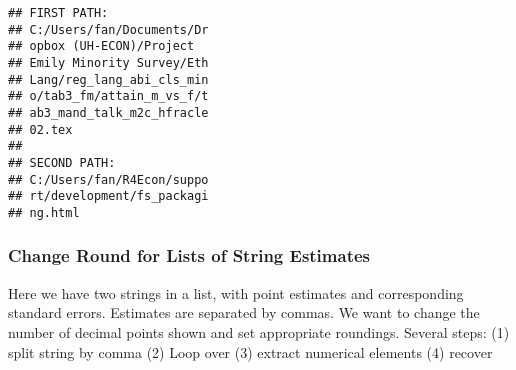 \documentclass[
]{book}
\begin{document}
\begin{verbatim}
## FIRST PATH:
## C:/Users/fan/Documents/Dr
## opbox (UH-ECON)/Project
## Emily Minority Survey/Eth
## Lang/reg_lang_abi_cls_min
## o/tab3_fm/attain_m_vs_f/t
## ab3_mand_talk_m2c_hfracle
## 02.tex
## 
## SECOND PATH:
## C:/Users/fan/R4Econ/suppo
## rt/development/fs_packagi
## ng.html
\end{verbatim}

\hypertarget{change-round-for-lists-of-string-estimates}{%
\subsubsection{Change Round for Lists of String Estimates}\label{change-round-for-lists-of-string-estimates}}

Here we have two strings in a list, with point estimates and corresponding standard errors. Estimates are separated by commas. We want to change the number of decimal points shown and set appropriate roundings. Several steps: (1) split string by comma (2) Loop over (3) extract numerical elements (4) recover
\end{document}
